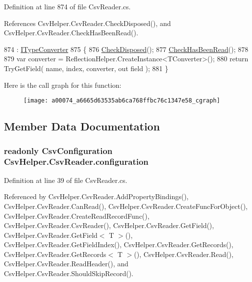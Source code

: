 Definition at line 874 of file Csv\-Reader.\-cs.



References Csv\-Helper.\-Csv\-Reader.\-Check\-Disposed(), and Csv\-Helper.\-Csv\-Reader.\-Check\-Has\-Been\-Read().


\begin{DoxyCode}
874                                                                                                            
          : \hyperlink{a00117}{ITypeConverter}
875         \{
876             \hyperlink{a00074_a6fa45a46ed1322dc1872ca2321b5edbc}{CheckDisposed}();
877             \hyperlink{a00074_a2d9249171ed1568e45d152766d364c31}{CheckHasBeenRead}();
878 
879             var converter = ReflectionHelper.CreateInstance<TConverter>();
880             \textcolor{keywordflow}{return} TryGetField( name, index, converter, out field );
881         \}
\end{DoxyCode}


Here is the call graph for this function\-:
\nopagebreak
\begin{figure}[H]
\begin{center}
\leavevmode
\texttt{[image: a00074\_a6665d63535ab6ca768ffbc76c1347e58\_cgraph]}
\end{center}
\end{figure}




\subsection{Member Data Documentation}
\hypertarget{a00074_a695622911e45cbac8d67dcbd9a3e2967}{
\subsubsection[{configuration}]{\setlength{\rightskip}{0pt plus 5cm}readonly {\bf Csv\-Configuration} Csv\-Helper.\-Csv\-Reader.\-configuration\hspace{0.3cm}{\ttfamily [private]}}}\label{a00074_a695622911e45cbac8d67dcbd9a3e2967}


Definition at line 39 of file Csv\-Reader.\-cs.



Referenced by Csv\-Helper.\-Csv\-Reader.\-Add\-Property\-Bindings(), Csv\-Helper.\-Csv\-Reader.\-Can\-Read(), Csv\-Helper.\-Csv\-Reader.\-Create\-Func\-For\-Object(), Csv\-Helper.\-Csv\-Reader.\-Create\-Read\-Record\-Func(), Csv\-Helper.\-Csv\-Reader.\-Csv\-Reader(), Csv\-Helper.\-Csv\-Reader.\-Get\-Field(), Csv\-Helper.\-Csv\-Reader.\-Get\-Field$<$ T $>$(), Csv\-Helper.\-Csv\-Reader.\-Get\-Field\-Index(), Csv\-Helper.\-Csv\-Reader.\-Get\-Records(), Csv\-Helper.\-Csv\-Reader.\-Get\-Records$<$ T $>$(), Csv\-Helper.\-Csv\-Reader.\-Read(), Csv\-Helper.\-Csv\-Reader.\-Read\-Header(), and Csv\-Helper.\-Csv\-Reader.\-Should\-Skip\-Record().

